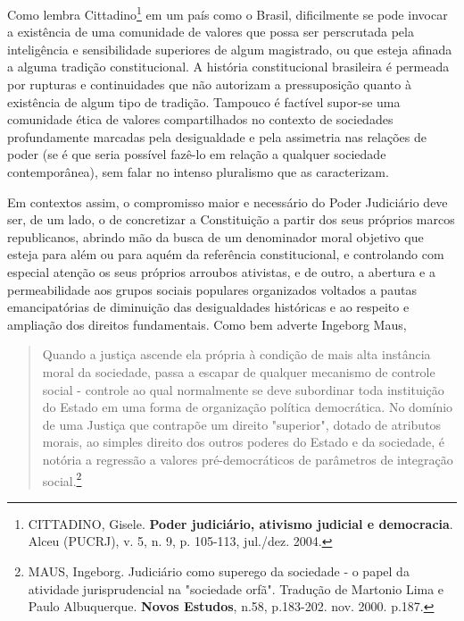 Como lembra Cittadino\footnote{CITTADINO, Gisele. \textbf{Poder
  judiciário, ativismo judicial e democracia}. Alceu (PUCRJ), v. 5, n.
  9, p. 105-113, jul./dez. 2004.} em um país como o Brasil, dificilmente
se pode invocar a existência de uma comunidade de valores que possa ser
perscrutada pela inteligência e sensibilidade superiores de algum
magistrado, ou que esteja afinada a alguma tradição constitucional. A
história constitucional brasileira é permeada por rupturas e
continuidades que não autorizam a pressuposição quanto à existência de
algum tipo de tradição. Tampouco é factível supor-se uma comunidade
ética de valores compartilhados no contexto de sociedades profundamente
marcadas pela desigualdade e pela assimetria nas relações de poder (se é
que seria possível fazê-lo em relação a qualquer sociedade
contemporânea), sem falar no intenso pluralismo que as caracterizam.

Em contextos assim, o compromisso maior e necessário do Poder Judiciário
deve ser, de um lado, o de concretizar a Constituição a partir dos seus
próprios marcos republicanos, abrindo mão da busca de um denominador
moral objetivo que esteja para além ou para aquém da referência
constitucional, e controlando com especial atenção os seus próprios
arroubos ativistas, e de outro, a abertura e a permeabilidade aos grupos
sociais populares organizados voltados a pautas emancipatórias de
diminuição das desigualdades históricas e ao respeito e ampliação dos
direitos fundamentais. Como bem adverte Ingeborg Maus,

\begin{quote}
Quando a justiça ascende ela própria à condição de mais alta instância
moral da sociedade, passa a escapar de qualquer mecanismo de controle
social - controle ao qual normalmente se deve subordinar toda
instituição do Estado em uma forma de organização política democrática.
No domínio de uma Justiça que contrapõe um direito "superior", dotado de
atributos morais, ao simples direito dos outros poderes do Estado e da
sociedade, é notória a regressão a valores pré-democráticos de
parâmetros de integração social.\footnote{MAUS, Ingeborg. Judiciário
  como superego da sociedade - o papel da atividade jurisprudencial na
  "sociedade orfã". Tradução de Martonio Lima e Paulo Albuquerque.
  \textbf{Novos Estudos}, n.58, p.183-202. nov. 2000. p.187.}
\end{quote}

